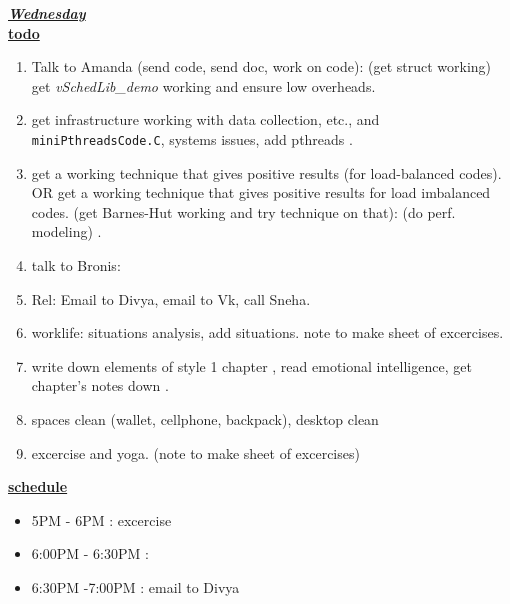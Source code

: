 \underline{\textbf{\textit{Wednesday}}}\\
\underline{\textbf{todo}}\\
\begin{enumerate}

\item Talk to Amanda (send code, send doc, work on code): (get struct working)  get \textit{vSchedLib\_demo} working and ensure low
overheads.

\item get infrastructure working with data collection, etc., and
\texttt{miniPthreadsCode.C}, systems issues, add pthreads .

\item get a working technique that gives positive results (for
load-balanced codes). OR get a working technique that gives positive
results for load imbalanced codes. (get Barnes-Hut
working and try technique on that): (do perf. modeling) .
\item talk to Bronis:

\item Rel: Email to Divya, email to Vk, call Sneha.

\item worklife: situations analysis, add situations. note to make sheet of excercises.

\item write down elements of style 1 chapter , read emotional
intelligence, get chapter's notes down .

\item spaces clean (wallet, cellphone, backpack), desktop clean

\item excercise and yoga. (note to make sheet of excercises)

\end{enumerate}

\underline{\textbf{schedule}}\\
\begin{itemize}

\item 5PM - 6PM : excercise

\item 6:00PM - 6:30PM :

\item 6:30PM -7:00PM : email to Divya
\end{itemize}


